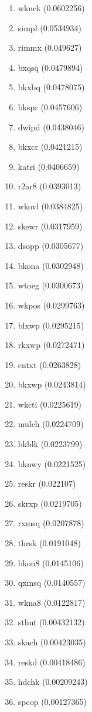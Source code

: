 \begin{enumerate}
\item wknck (0.0602256)
\item simpl (0.0534934)
\item rimmx (0.049627)
\item bxqsq (0.0479894)
\item bkxbq (0.0478075)
\item bkspr (0.0457606)
\item dwipd (0.0438046)
\item bkxcr (0.0421215)
\item katri (0.0406659)
\item r2ar8 (0.0393013)
\item wkovl (0.0384825)
\item skewr (0.0317959)
\item dsopp (0.0305677)
\item bkona (0.0302948)
\item wtoeg (0.0300673)
\item wkpos (0.0299763)
\item blxwp (0.0295215)
\item rkxwp (0.0272471)
\item cntxt (0.0263828)
\item bkxwp (0.0243814)
\item wkcti (0.0225619)
\item mulch (0.0224709)
\item bkblk (0.0223799)
\item bknwy (0.0221525)
\item reskr (0.022107)
\item skrxp (0.0219705)
\item rxmsq (0.0207878)
\item thrsk (0.0191048)
\item bkon8 (0.0145106)
\item qxmsq (0.0140557)
\item wkna8 (0.0122817)
\item stlmt (0.00432132)
\item skach (0.00423035)
\item reskd (0.00418486)
\item hdchk (0.00209243)
\item spcop (0.00127365)
\end{enumerate}